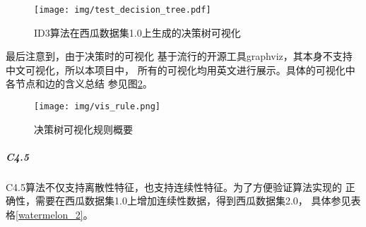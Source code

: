 \documentclass[main.tex]{subfiles}
\begin{document}
\begin{figure}[htbp!]
    \centering \texttt{[image: img/test\_decision\_tree.pdf]} 
    \caption{ID3算法在西瓜数据集1.0上生成的决策树可视化}
    \label{dt_id3_vis}
\end{figure}

最后注意到，由于决策时的可视化
基于流行的开源工具graphviz，其本身不支持中文可视化，所以本项目中，
所有的可视化均用英文进行展示。具体的可视化中各节点和边的含义总结
参见图\ref{dt_vis_rule}。

\begin{figure}[htbp!]
    \centering \texttt{[image: img/vis\_rule.png]} 
    \caption{决策树可视化规则概要}
    \label{dt_vis_rule}
\end{figure}


\subparagraph{C4.5}
C4.5算法不仅支持离散性特征，也支持连续性特征。为了方便验证算法实现的
正确性，需要在西瓜数据集1.0上增加连续性数据，得到西瓜数据集2.0\cite{zhzhou}，
具体参见表格\ref{watermelon_2}。
\end{document}
